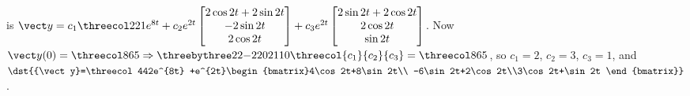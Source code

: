 \documentclass[openany]{book}
\newenvironment{sectionSolutions}{
 \begin{enumerate}[item-label={\thesection.\arabic{enumi}.}]
}{
 \end{enumerate}
}
\begin{document}
\begin{sectionSolutions}
is ${\vect y}=c_1\threecol221e^{8t}+c_2
e^{2t}\begin{bmatrix}2\cos2t+2\sin2t
\\-2\sin2t\\2\cos2t\end{bmatrix}+
c_3e^{2t}\begin{bmatrix}2\sin2t+2\cos2t
\\2\cos2t\\\sin2t\end{bmatrix}$.
Now ${\vect y}(0)=\threecol865\Rightarrow\threebythree22{-2}202110
\threecol{c_1}{c_2}{c_3}=\threecol865$, so $c_1=2$, $c_2=3$,
$c_3=1$, and $\dst{{\vect y}=\threecol442e^{8t}
+e^{2t}\begin{bmatrix}4\cos2t+8\sin2t\\
-6\sin2t+2\cos2t\\3\cos2t+\sin2t
\end{bmatrix}}$.



\end{sectionSolutions}
\end{document}
